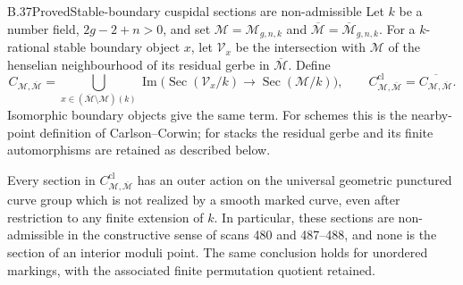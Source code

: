 \begin{statement}{B.37}{Proved}{Stable-boundary cuspidal sections are non-admissible}
Let $k$ be a number field, $2g-2+n>0$, and set
$\mathcal M=\mathcal M_{g,n,k}$ and
$\overline{\mathcal M}=\overline{\mathcal M}_{g,n,k}$.
For a $k$-rational stable boundary object $x$, let
$\mathcal V_x$ be the intersection with $\mathcal M$ of
the henselian neighbourhood of its residual gerbe in
$\overline{\mathcal M}$. Define
\[
 C_{\mathcal M,\overline{\mathcal M}}
 =\bigcup_{x\in(\overline{\mathcal M}\setminus\mathcal M)(k)}
 \operatorname{Im}\bigl(
       \operatorname{Sec}(\mathcal V_x/k)
        \longrightarrow\operatorname{Sec}(\mathcal M/k)\bigr),
 \qquad
 C^{\mathrm{cl}}_{\mathcal M,\overline{\mathcal M}}
 =\overline{C_{\mathcal M,\overline{\mathcal M}}}.
 \tag{B.37.1}
\]
Isomorphic boundary objects give the same term. For schemes
this is the nearby-point definition of Carlson--Corwin;
for stacks the residual gerbe and its finite automorphisms
are retained as described below.

Every section in $C^{\mathrm{cl}}_{\mathcal M,\overline{\mathcal M}}$
has an outer action on the universal geometric punctured
curve group which is not realized by a smooth marked curve,
even after restriction to any finite extension of $k$.
In particular, these sections are non-admissible in the
constructive sense of scans 480 and 487--488, and none is
the section of an interior moduli point. The same conclusion
holds for unordered markings, with the associated finite
permutation quotient retained.
\end{statement}
